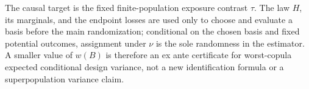 The causal target is the fixed finite-population exposure contrast \(\tau\).  The law \(H\), its marginals, and the endpoint losses are used only to choose and evaluate a basis before the main randomization; conditional on the chosen basis and fixed potential outcomes, assignment under \(\nu\) is the sole randomness in the estimator.  A smaller value of \(w(B)\) is therefore an ex ante certificate for worst-copula expected conditional design variance, not a new identification formula or a superpopulation variance claim.